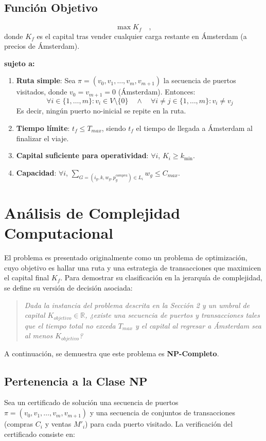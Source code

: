 \documentclass[12pt, a4paper]{article}
\begin{document}
\subsection{Función Objetivo}

\[\max K_f \quad ,\] donde $K_f$ es el capital tras vender cualquier carga restante en Ámsterdam (a precios de Ámsterdam).

\textbf{sujeto a:}
\begin{enumerate}
    \item \textbf{Ruta simple}: Sea $\pi = (v_0, v_1, \dots, v_m, v_{m+1})$ la secuencia de puertos visitados, donde $v_0 = v_{m+1} = 0$ (Ámsterdam). Entonces:
    \[
    \forall i \in \{1, \dots, m\}: v_i \in V \setminus \{0\} \quad \wedge  \quad \forall i \neq j \in \{1, \dots, m\}: v_i \neq v_j
    \]
    Es decir, ningún puerto no-inicial se repite en la ruta.
    \item \textbf{Tiempo límite}: $t_f \leq T_{max}$, siendo $t_f$ el tiempo de llegada a Ámsterdam al finalizar el viaje.
    \item \textbf{Capital suficiente para operatividad}: $\forall i$, $K_i \geq k_{\min}$.
    \item \textbf{Capacidad}: $\forall i$, $\sum_{G = (i_g, k, w_g, p_g^{compra}) \in L_i} w_g \leq C_{max}$.
\end{enumerate}

\section{Análisis de Complejidad Computacional}

El problema es presentado originalmente como un problema de optimización, cuyo objetivo es hallar una ruta y una estrategia de transacciones que maximicen el capital final $K_f$. Para demostrar su clasificación en la jerarquía de complejidad, se define su versión de decisión asociada:

\begin{quote}
    \textit{Dada la instancia del problema descrita en la Sección 2 y un umbral de capital $K_{objetivo} \in \mathbb{R}$, ¿existe una secuencia de puertos y transacciones tales que el tiempo total no exceda $T_{max}$ y el capital al regresar a Ámsterdam sea al menos $K_{objetivo}$?}
\end{quote}

A continuación, se demuestra que este problema es \textbf{NP-Completo}.

\subsection{Pertenencia a la Clase NP}
Sea un certificado de solución una secuencia de puertos $\pi = (v_0, v_1, \dots, v_m, v_{m+1})$ y una secuencia de conjuntos de transacciones (compras $C_i$ y ventas $M'_i$) para cada puerto visitado. La verificación del certificado consiste en:
\end{document}

